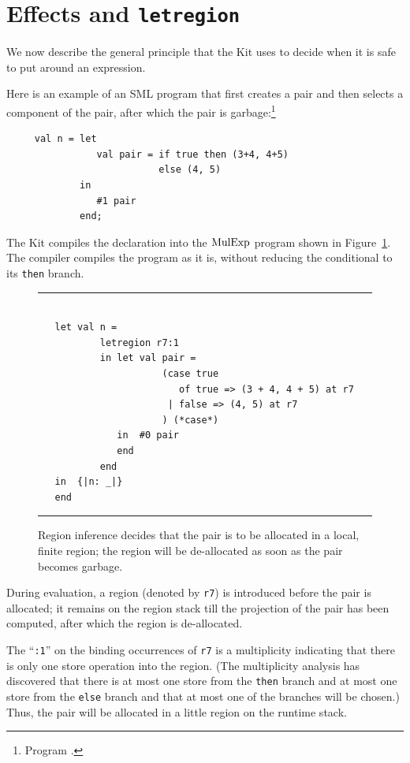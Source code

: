 \documentclass[12pt]{book}
\begin{document}
\section{Effects and {\tt letregion}}
\label{effects.sec}
We now describe the general principle that the Kit uses to decide
when it is safe to put  around  an expression.

Here is an example of an SML program that first creates a pair and
then selects a component of the pair, after which the pair is garbage:\footnote{Program .}
\begin{verbatim}
     val n = let 
                val pair = if true then (3+4, 4+5) 
                           else (4, 5)
             in 
                #1 pair
             end;
\end{verbatim}
The Kit compiles the declaration into the 
$\hbox{\rm MulExp}$ program shown in Figure~\ref{elimpair.fig}.
The compiler compiles the program as it is, without reducing the conditional
to its {\tt then} branch.
\begin{figure}
\hrule
\begin{verbatim}

   let val n = 
           letregion r7:1 
           in let val pair = 
                      (case true 
                         of true => (3 + 4, 4 + 5) at r7 
                       | false => (4, 5) at r7
                      ) (*case*) 
              in  #0 pair
              end  
           end
   in  {|n: _|}
   end 
\end{verbatim}
\caption{Region inference decides that the 
pair is to be allocated in a local, finite region; the region will be de-allocated
as soon as the pair becomes garbage.}
\medskip

\hrule
\label{elimpair.fig}
\end{figure}
During evaluation, a region (denoted by {\tt r7}) 
is introduced before the pair is allocated;
it remains on the region stack till the projection of the pair
has been computed, after which the region is de-allocated. 

The ``{\tt :1}'' on the binding occurrences of {\tt r7}
is a multiplicity indicating that there is only one store
operation into the region. (The 
%
multiplicity analysis has discovered that there is at most one store
from the {\tt then} branch and at most one store from the {\tt else}
branch and that at most one of the branches will be chosen.) Thus, the
pair will be allocated in a little region on the runtime stack.
\end{document}

